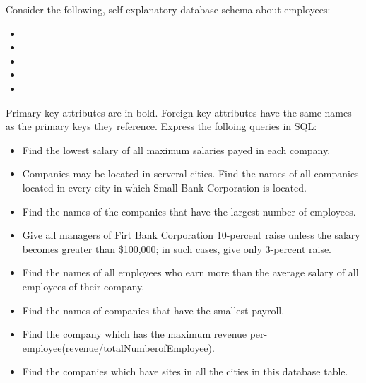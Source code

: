 \documentclass[12pt]{article}
\begin{document}
Consider the following, self-explanatory database schema about employees:
\begin{itemize}
\item
{}
\item
{}
\item
{}
\item
{}
\item
{}
\end{itemize}
Primary key attributes are in bold. Foreign key attributes have the same names as the primary 
keys they reference. Express the folloing queries in SQL:
\begin{itemize}
\item Find the lowest salary of all maximum salaries payed in each company.
\item Companies may be located in serveral cities. Find the names of all companies located in every
 city in which Small Bank Corporation is located.
\item Find the names of the companies that have the largest number of employees.
\item Give all managers of Firt Bank Corporation 10-percent raise unless the salary becomes greater than
 \$100,000; in such cases, give only 3-percent raise.
\item Find the names of all employees who earn more than the average salary of all employees of their company.
\item Find the names of companies that have the smallest payroll.
\item Find the company which has the maximum revenue per-employee(revenue/totalNumberofEmployee).
\item Find the companies which have sites in all the cities in this database table.
\end{itemize}
\end{document}
